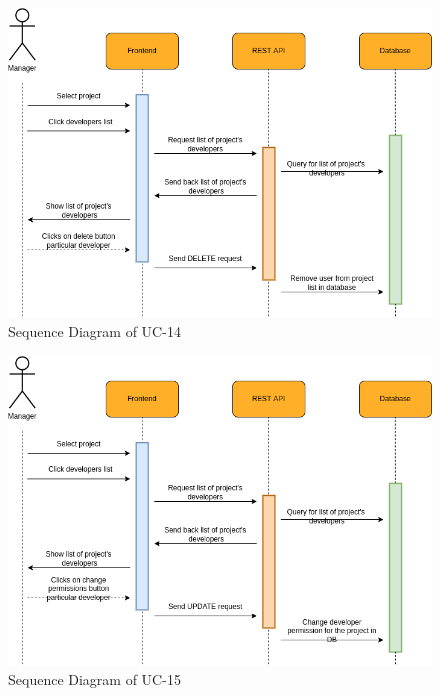         \begin{figure}[H]
            \centering
            \includegraphics[scale=0.5]{./diagrams/sequence/seq-14.png}
            \caption{Sequence Diagram of UC-14}
            \label{fig:seq-14}
            
        \end{figure}
    

        \begin{figure}[H]
            \centering
            \includegraphics[scale=0.5]{./diagrams/sequence/seq-15.png}
            \caption{Sequence Diagram of UC-15}
            \label{fig:seq-15}
            
        \end{figure}
    

